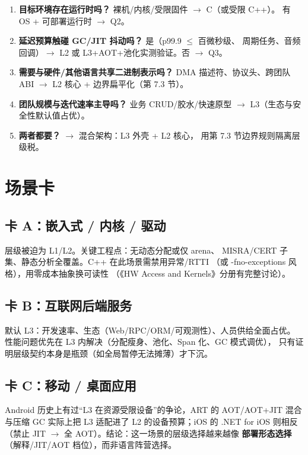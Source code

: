 \documentclass[12pt,a4paper,fontset=fandol]{ctexbook}
\begin{document}
\begin{enumerate}[label=\textbf{Q\arabic*.}]
  \item \textbf{目标环境存在运行时吗？} 裸机/内核/受限固件 $\to$ C（或受限 C++）。
        有 OS + 可部署运行时 $\to$ Q2。
  \item \textbf{延迟预算触碰 GC/JIT 抖动吗？} 是（p99.9 $\le$ 百微秒级、
        周期任务、音频回调）$\to$ L2 或 L3+AOT+池化实测验证。否 $\to$ Q3。
  \item \textbf{需要与硬件/其他语言共享二进制表示吗？}
        DMA 描述符、协议头、跨团队 ABI $\to$ L2 核心 + 边界扁平化（第 7.3 节）。
  \item \textbf{团队规模与迭代速率主导吗？} 业务 CRUD/胶水/快速原型
        $\to$ L3（生态与安全性默认值占优）。
  \item \textbf{两者都要？} $\to$ 混合架构：L3 外壳 + L2 核心，
        用第 7.3 节边界规则隔离层级税。
\end{enumerate}

\section{场景卡}

\subsection*{卡 A：嵌入式 / 内核 / 驱动}

层级被迫为 L1/L2。关键工程点：无动态分配或仅 arena、
MISRA/CERT 子集、静态分析全覆盖。C++ 在此场景需禁用异常/RTTI
（或 -fno-exceptions 风格），用零成本抽象换可读性
（《HW Access and Kernels》分册有完整讨论）。

\subsection*{卡 B：互联网后端服务}

默认 L3：开发速率、生态（Web/RPC/ORM/可观测性）、人员供给全面占优。
性能问题优先在 L3 内解决（分配瘦身、池化、Span 化、GC 模式调优），
只有证明层级契约本身是瓶颈（如全局暂停无法摊薄）才下沉。

\subsection*{卡 C：移动 / 桌面应用}

Android 历史上有过``L3 在资源受限设备''的争论，ART 的 AOT/AOT+JIT 混合
与压缩 GC 实际上把 L3 适配进了 L2 的设备预算；iOS 的 .NET for iOS
则相反（禁止 JIT $\to$ 全 AOT）。结论：这一场景的层级选择越来越像
\textbf{部署形态选择}（解释/JIT/AOT 档位），而非语言阵营选择。
\end{document}
